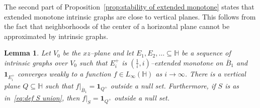 \documentclass[11pt,reqno]{amsart}
\renewcommand{\H}{\mathbb{H}}
\newcommand{\0}{\mathbf{0}}
\renewcommand{\1}{\mathbf 1}
\newcommand{\one}{\mathbf{1}}
\renewcommand{\subset}{\subseteq}
\newtheorem{lemma}[thm]{Lemma}
\theoremstyle{remark}
\begin{document}
The second part of Proposition~\ref{prop:stability of extended monotone} states that extended monotone intrinsic graphs are close to vertical planes.  This follows from the fact that neighborhoods of the center of a horizontal plane cannot be approximated by intrinsic graphs.
\begin{lemma}\label{lem:LEM vertical half-spaces}
  Let $V_0$ be the $xz$--plane and let $E_1,E_2,\ldots\subset \H$ be a sequence of intrinsic graphs over $V_0$ such that $E_i^+$ is $(\frac{1}{i},i)$--extended monotone on $\overline{B}_1$ and $\one_{E_i^+}$ converges weakly to a function $f\in L_\infty(\H)$ as $i\to \infty$. There is a vertical plane $Q\subset \H$ such that $f|_{\overline{B}_1}=\one_{Q^+}$ outside a null set.  Furthermore, if $S$ is as in~\eqref{eq:def S union}, then  $f|_{S}=\one_{Q^+}$ outside a null set.
\end{lemma}
\end{document}
